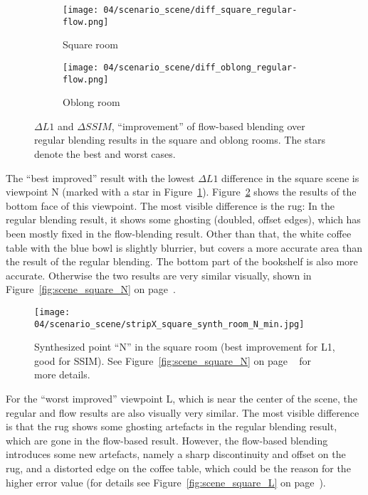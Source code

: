 \begin{figure}
\centering
    \hfill
    \begin{subfigure}[b]{0.45\textwidth}
            \centering
            \texttt{[image: 04/scenario\_scene/diff\_square\_regular-flow.png]}
            \caption{Square room}
    \end{subfigure}
    \hfill
    \begin{subfigure}[b]{0.45\textwidth}
            \centering
            \texttt{[image: 04/scenario\_scene/diff\_oblong\_regular-flow.png]}
            \caption{Oblong room}
    \end{subfigure}
    \hfill
  \caption[$\Delta L1$ and $\Delta SSIM$ in the square and oblong rooms]{$\Delta L1$ and $\Delta SSIM$, ``improvement'' of flow-based blending over regular blending results in the square and oblong rooms. The stars denote the best and worst cases.} \label{fig:scene_diff_square_oblong}
\end{figure}

The ``best improved'' result with the lowest $\Delta L1$ difference in the square scene is viewpoint N (marked with a star in Figure~\ref{fig:scene_diff_square_oblong}). Figure~\ref{fig:scene_square_N_min} shows the results of the bottom face of this viewpoint. The most visible difference is the rug: In the regular blending result, it shows some ghosting (doubled, offset edges), which has been mostly fixed in the flow-blending result. Other than that, the white coffee table with the blue bowl is slightly blurrier, but covers a more accurate area than the result of the regular blending. The bottom part of the bookshelf is also more accurate. Otherwise the two results are very similar visually, shown in Figure~\ref{fig:scene_square_N} on page~\pageref{fig:scene_square_N}.

\begin{figure}
  \centering
  \texttt{[image: 04/scenario\_scene/stripX\_square\_synth\_room\_N\_min.jpg]}
  \caption[Bottom face of viewpoint ``N'' in the square room]{Synthesized point ``N'' in the square room (best improvement for L1, good for SSIM). See Figure~\ref{fig:scene_square_N} on page ~\pageref{fig:scene_square_N} for more details.}
  \label{fig:scene_square_N_min}
\end{figure}

For the ``worst improved'' viewpoint L, which is near the center of the scene, the regular and flow results are also visually very similar. The most visible difference is that the rug shows some ghosting artefacts in the regular blending result, which are gone in the flow-based result. However, the flow-based blending introduces some new artefacts, namely a sharp discontinuity and offset on the rug, and a distorted edge on the coffee table, which could be the reason for the higher error value (for details see Figure~\ref{fig:scene_square_L} on page~\pageref{fig:scene_square_L}).

